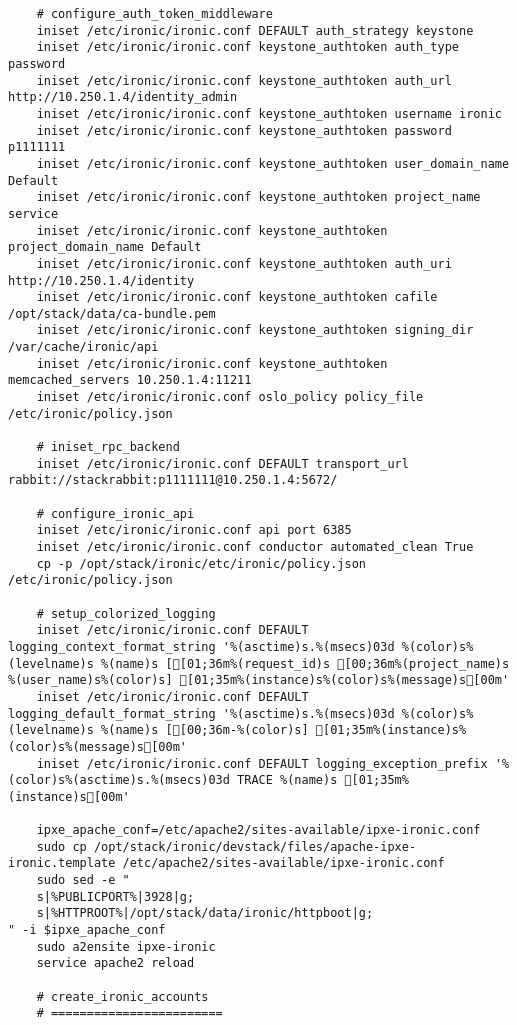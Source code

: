 \documentclass[a4paper,left=1.5cm,right=1.5cm,11pt]{article}
\begin{document}
\begin{lstlisting}
	# configure_auth_token_middleware
	iniset /etc/ironic/ironic.conf DEFAULT auth_strategy keystone
	iniset /etc/ironic/ironic.conf keystone_authtoken auth_type password
    iniset /etc/ironic/ironic.conf keystone_authtoken auth_url http://10.250.1.4/identity_admin
    iniset /etc/ironic/ironic.conf keystone_authtoken username ironic
    iniset /etc/ironic/ironic.conf keystone_authtoken password p1111111
    iniset /etc/ironic/ironic.conf keystone_authtoken user_domain_name Default
    iniset /etc/ironic/ironic.conf keystone_authtoken project_name service
    iniset /etc/ironic/ironic.conf keystone_authtoken project_domain_name Default
    iniset /etc/ironic/ironic.conf keystone_authtoken auth_uri http://10.250.1.4/identity
    iniset /etc/ironic/ironic.conf keystone_authtoken cafile /opt/stack/data/ca-bundle.pem
    iniset /etc/ironic/ironic.conf keystone_authtoken signing_dir /var/cache/ironic/api
    iniset /etc/ironic/ironic.conf keystone_authtoken memcached_servers 10.250.1.4:11211
    iniset /etc/ironic/ironic.conf oslo_policy policy_file /etc/ironic/policy.json

	# iniset_rpc_backend
	iniset /etc/ironic/ironic.conf DEFAULT transport_url rabbit://stackrabbit:p1111111@10.250.1.4:5672/

	# configure_ironic_api
	iniset /etc/ironic/ironic.conf api port 6385
    iniset /etc/ironic/ironic.conf conductor automated_clean True
	cp -p /opt/stack/ironic/etc/ironic/policy.json /etc/ironic/policy.json
	
	# setup_colorized_logging
	iniset /etc/ironic/ironic.conf DEFAULT logging_context_format_string '%(asctime)s.%(msecs)03d %(color)s%(levelname)s %(name)s [[01;36m%(request_id)s [00;36m%(project_name)s %(user_name)s%(color)s] [01;35m%(instance)s%(color)s%(message)s[00m'
    iniset /etc/ironic/ironic.conf DEFAULT logging_default_format_string '%(asctime)s.%(msecs)03d %(color)s%(levelname)s %(name)s [[00;36m-%(color)s] [01;35m%(instance)s%(color)s%(message)s[00m'
	iniset /etc/ironic/ironic.conf DEFAULT logging_exception_prefix '%(color)s%(asctime)s.%(msecs)03d TRACE %(name)s [01;35m%(instance)s[00m'

	ipxe_apache_conf=/etc/apache2/sites-available/ipxe-ironic.conf
	sudo cp /opt/stack/ironic/devstack/files/apache-ipxe-ironic.template /etc/apache2/sites-available/ipxe-ironic.conf
	sudo sed -e "
	s|%PUBLICPORT%|3928|g;
	s|%HTTPROOT%|/opt/stack/data/ironic/httpboot|g;
" -i $ipxe_apache_conf
	sudo a2ensite ipxe-ironic
	service apache2 reload

	# create_ironic_accounts
	# ========================


\end{lstlisting}
\end{document}
